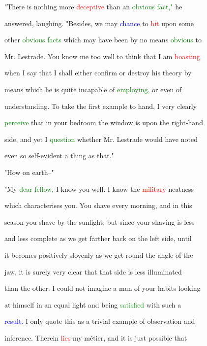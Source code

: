  "There is nothing more \textcolor{red}{deceptive} than an \textcolor{green}{obvious} \textcolor{green}{fact,"} he

 answered, \textcolor{BurntOrange}{laughing.} "Besides, we may \textcolor{blue}{chance} to \textcolor{red}{hit} upon some

 other \textcolor{green}{obvious} \textcolor{green}{facts} which may have been by no means \textcolor{green}{obvious} to

 Mr. Lestrade. You know me too well to think that I am \textcolor{red}{boasting}

 when I say that I shall either confirm or destroy his \textcolor{BurntOrange}{theory} by

 means which he is quite incapable of \textcolor{green}{employing,} or even of

 understanding. To take the first example to hand, I very clearly

 \textcolor{green}{perceive} that in your bedroom the window is upon the right-hand

 side, and yet I \textcolor{green}{question} whether Mr. Lestrade would have noted

 even so self-evident a thing as that."



 "How on earth--"



 "My \textcolor{green}{dear} \textcolor{green}{fellow,} I know you well. I know the \textcolor{red}{military} neatness

 which characterises you. You shave every morning, and in this

 season you shave by the sunlight; but since your shaving is less

 and less complete as we get farther back on the left side, until

 it becomes positively slovenly as we get round the angle of the

 jaw, it is surely very clear that that side is less \textcolor{BurntOrange}{illuminated}

 than the other. I could not imagine a man of your habits looking

 at himself in an equal light and being \textcolor{green}{satisfied} with such a

 \textcolor{blue}{result.} I only \textcolor{BurntOrange}{quote} this as a trivial example of observation and

 inference. Therein \textcolor{red}{lies} my métier, and it is just possible that

